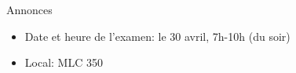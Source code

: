 \begin{frame}{Annonces}
  \begin{itemize}
    \item Date et heure de l'examen: le 30 avril, 7h-10h (\alert{du soir})
    \item Local: MLC 350
  \end{itemize}
\end{frame}